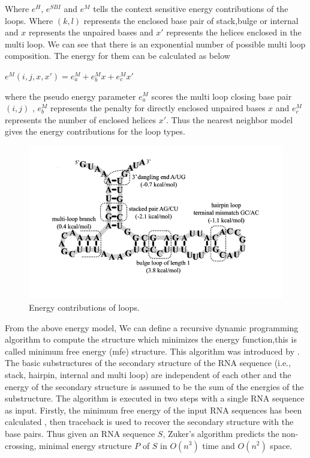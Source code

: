 \documentclass[twoside,a4paper]{report}
\begin{document}
 	 Where $e^H$, $e^{SBI}$ and $e^M$ tells the context sensitive energy contributions of the loops. Where $(k,l)$ represents the enclosed base pair of stack,bulge or internal and $x$ represents the unpaired bases and $x'$ represents the helices enclosed in the multi loop. We can see that there is an exponential number of possible multi loop composition. The energy for them can be calculated as below \\
 	 \begin{center}
 	 $e^M(i,j,x,x')= e^M_a+e^M_bx+e^M_cx'$\\
 	\end{center}
 	 where the pseudo energy parameter $e^M_a$ scores the multi loop closing base pair $(i,j)$ , $e^M_b$ represents the penalty for directly enclosed unpaired bases $x$ and $e^M_c$ represents the number of enclosed helices $x'$.
 	 Thus the nearest neighbor model gives the energy contributions for the loop types. \\
 	 
 	 \begin{figure}[h]
 	 	\includegraphics[width=0.9\linewidth]{energy}
 	 	\centering
 	 	\caption{Energy contributions of loops. \citep{andronescu2010computational}}
 	 	\label{fig:energycontribution}
 	 \end{figure}
 	 
 	 
 	 From the above energy model, We can define a recursive dynamic programming algorithm to compute the structure which minimizes the energy function,this is called minimum free energy (mfe) structure. This algorithm was introduced by \citep{zuker1981optimal}.\\
 	 
 	 The basic substructures of the secondary structure of the RNA sequence (i.e., stack, hairpin, internal and multi loop) are independent of each other and the energy of the secondary structure is assumed to be the sum of the energies of the substructure. The algorithm is executed in two steps with a single RNA sequence as input. Firstly, the minimum free energy of the input RNA sequences has been calculated , then traceback is used to recover the secondary structure with the base pairs. Thus given an RNA sequence $S$, Zuker’s algorithm predicts the non-crossing, minimal energy structure $P$ of $S$ in $O(n^3)$ time and $O(n^2)$ space.\\
 	 
\end{document}
